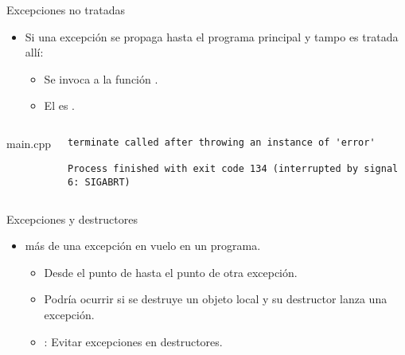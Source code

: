 \begin{frame}[t,fragile]{Excepciones no tratadas}
\begin{itemize}
  \item Si una excepción se propaga hasta el programa principal y tampo es tratada allí:
    \begin{itemize}
      \item Se invoca a la función .
      \item El  es 
            .
    \end{itemize}
\end{itemize}

\pause
\begin{columns}[T]

\begin{block}{main.cpp}

\end{block}

\pause
{}
\begin{lstlisting}[style=terminal]
terminate called after throwing an instance of 'error'

Process finished with exit code 134 (interrupted by signal 6: SIGABRT)
\end{lstlisting}

\end{columns}
\end{frame}

\begin{frame}[t]{Excepciones y destructores}
\begin{itemize}
  \item {} más de una excepción en vuelo en un programa.
    \begin{itemize}
      \item Desde el punto de  hasta el punto de 
             otra excepción.
      \item Podría ocurrir si se destruye un objeto local y su destructor
            lanza una excepción.
      \item {}: Evitar excepciones en destructores.
    \end{itemize}
\end{itemize}

\begin{columns}[T]




\end{columns}
\end{frame}

